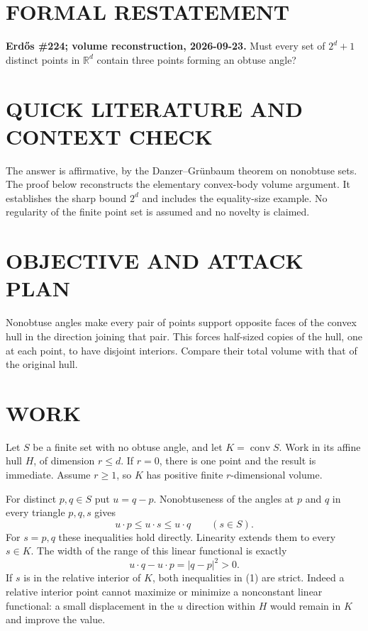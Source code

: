 \section{FORMAL RESTATEMENT}
\textbf{Erd\H{o}s \#224; volume reconstruction, 2026-09-23.}
Must every set of $2^d+1$ distinct points in $\mathbb R^d$ contain three points forming an obtuse angle?

\section{QUICK LITERATURE AND CONTEXT CHECK}
The answer is affirmative, by the Danzer--Gr\"unbaum theorem on nonobtuse sets. The proof below reconstructs the elementary convex-body volume argument. It establishes the sharp bound $2^d$ and includes the equality-size example. No regularity of the finite point set is assumed and no novelty is claimed.

\section{OBJECTIVE AND ATTACK PLAN}
Nonobtuse angles make every pair of points support opposite faces of the convex hull in the direction joining that pair. This forces half-sized copies of the hull, one at each point, to have disjoint interiors. Compare their total volume with that of the original hull.

\section{WORK}
Let $S$ be a finite set with no obtuse angle, and let $K=\operatorname{conv}S$. Work in its affine hull $H$, of dimension $r\leq d$. If $r=0$, there is one point and the result is immediate. Assume $r\geq1$, so $K$ has positive finite $r$-dimensional volume.

For distinct $p,q\in S$ put $u=q-p$. Nonobtuseness of the angles at $p$ and $q$ in every triangle $p,q,s$ gives
\[
u\cdot p\leq u\cdot s\leq u\cdot q\qquad(s\in S).
\tag{1}
\]
For $s=p,q$ these inequalities hold directly. Linearity extends them to every $s\in K$. The width of the range of this linear functional is exactly
\[
u\cdot q-u\cdot p=|q-p|^2>0.
\tag{2}
\]
If $s$ is in the relative interior of $K$, both inequalities in (1) are strict. Indeed a relative interior point cannot maximize or minimize a nonconstant linear functional: a small displacement in the $u$ direction within $H$ would remain in $K$ and improve the value.

